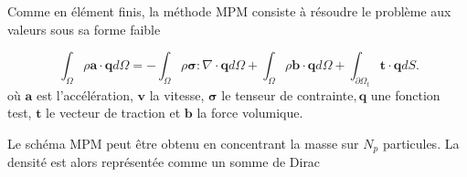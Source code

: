Comme en élément finis, la méthode MPM consiste à résoudre le problème aux valeurs sous sa forme faible

\begin{equation*}~\label{eq:form_faible}
    \int_\Omega \rho \bm a \cdot \bm q d\Omega = - \int_\Omega \rho \bm \sigma : \nabla \cdot \bm q d\Omega + \int_\Omega \rho \bm b\cdot \bm q d\Omega + \int_{\partial \Omega_t}  \bm t \cdot \bm q dS.
\end{equation*}où $\bm a$ est l'accélération, $\bm v$ la vitesse, $\bm \sigma$ le tenseur de contrainte$, \bm q$ une fonction test, $\bm t$ le vecteur de traction et $\bm b$ la force volumique.


Le schéma MPM peut être obtenu en concentrant la masse sur $N_p$ particules. La densité est alors représentée comme un somme de Dirac

